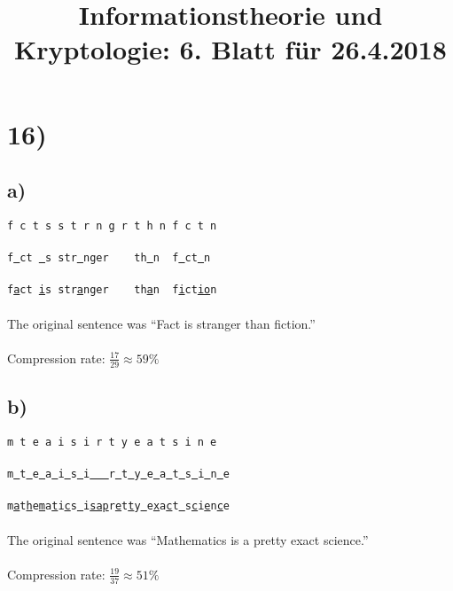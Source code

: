%



  \title{Informationstheorie und Kryptologie: 6. Blatt für 26.4.2018}
  \maketitle

  \section*{16)}

  \subsection*{a)}

  \texttt{f c t s s t r n g r t h n f c t n} \\
  \\
  \texttt{f\underline{\ }ct \underline{\ }s str\underline{\ }nger\ \ \ \ th\underline{\ }n\ \ f\underline{\ }ct\underline{\ }n} \\
  \\
  \texttt{f\underline{a}ct \underline{i}s str\underline{a}nger\ \ \ \ th\underline{a}n\ \ f\underline{i}ct\underline{io}n} \\
  \\
  The original sentence was “Fact is stranger than fiction.” \\
  \\
  Compression rate: $\frac{17}{29} \approx 59\% $

  \subsection*{b)}

  \texttt{m t e a i s i \textvisiblespace{ }\textvisiblespace{ }r t y e a t s i n e} \\
  \\
  \texttt{m\underline{\ }t\underline{\ }e\underline{\ }a\underline{\ }i\underline{\ }s\underline{\ }i\underline{\ }\textvisiblespace\underline{\ }\textvisiblespace\underline{\ }r\underline{\ }t\underline{\ }y\underline{\ }e\underline{\ }a\underline{\ }t\underline{\ }s\underline{\ }i\underline{\ }n\underline{\ }e} \\
  \\
  \texttt{m\underline{a}t\underline{h}e\underline{m}a\underline{t}i\underline{c}s\underline{\ }i\underline{s}\textvisiblespace\underline{a}\textvisiblespace\underline{p}r\underline{e}t\underline{t}y\underline{\ }e\underline{x}a\underline{c}t\underline{\ }s\underline{c}i\underline{e}n\underline{c}e} \\
  \\
  The original sentence was “Mathematics is a pretty exact science.” \\
  \\
  Compression rate: $\frac{19}{37} \approx 51\% $

